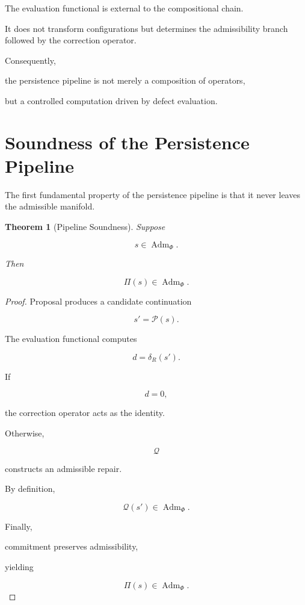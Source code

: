 \documentclass[11pt]{book}
\numberwithin{equation}{chapter}
\theoremstyle{definition}
\theoremstyle{plain}
\newtheorem{theorem}[definition]{Theorem}
\begin{document}
The evaluation functional is external to the compositional chain.

It does not transform configurations but determines the admissibility
branch followed by the correction operator.

Consequently,

the persistence pipeline is not merely a composition of operators,

but a controlled computation driven by defect evaluation.

\section{Soundness of the Persistence Pipeline}

The first fundamental property of the persistence pipeline is that it
never leaves the admissible manifold.

\begin{theorem}[Pipeline Soundness]

Suppose

\[
s
\in
\operatorname{Adm}_{\Phi}.
\]

Then

\[
\Pi(s)
\in
\operatorname{Adm}_{\Phi}.
\]

\end{theorem}

\begin{proof}

Proposal produces a candidate continuation

\[
s'
=
\mathcal P(s).
\]

The evaluation functional computes

\[
d
=
\delta_R(s').
\]

If

\[
d=0,
\]

the correction operator acts as the identity.

Otherwise,

\[
\mathcal Q
\]

constructs an admissible repair.

By definition,

\[
\mathcal Q
(
s'
)
\in
\operatorname{Adm}_{\Phi}.
\]

Finally,

commitment preserves admissibility,

yielding

\[
\Pi(s)
\in
\operatorname{Adm}_{\Phi}.
\]

\end{proof}
\end{document}
